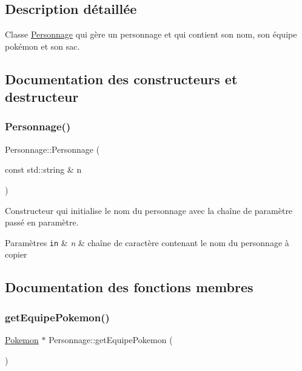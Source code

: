 \subsection{Description détaillée}
Classe \hyperlink{class_personnage}{Personnage} qui gère un personnage et qui contient son nom, son équipe pokémon et son sac. 

\subsection{Documentation des constructeurs et destructeur}
\mbox{\label{class_personnage_a5aaac2a4ab4d33e721c3d118de4e9785}} 
\subsubsection{\texorpdfstring{Personnage()}{Personnage()}}
{\footnotesize\ttfamily Personnage\+::\+Personnage (\begin{DoxyParamCaption}\item[{const std\+::string \&}]{n }\end{DoxyParamCaption})}



Constructeur qui initialise le nom du personnage avec la chaîne de paramètre passé en paramètre. 


\begin{DoxyParams}[1]{Paramètres}
\mbox{\tt in}  & {\em n} & chaîne de caractère contenant le nom du personnage à copier \\
\hline
\end{DoxyParams}


\subsection{Documentation des fonctions membres}
\mbox{\label{class_personnage_a853a057817adeacdf048534cf30254d2}} 
\subsubsection{\texorpdfstring{get\+Equipe\+Pokemon()}{getEquipePokemon()}}
{\footnotesize\ttfamily \hyperlink{class_pokemon}{Pokemon} $\ast$ Personnage\+::get\+Equipe\+Pokemon (\begin{DoxyParamCaption}{ }\end{DoxyParamCaption})}



